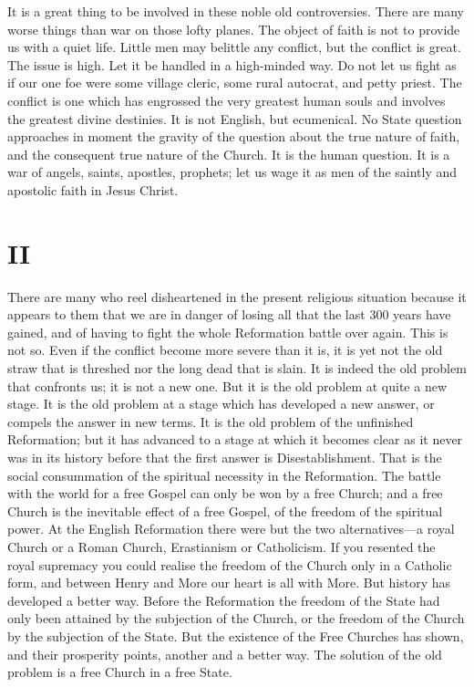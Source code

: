 \documentclass[12pt,a5paper,twoside]{book}
\begin{document}
It is a great thing to be involved in these noble 
old controversies. There are many worse things 
than war on those lofty planes. The object of faith 
is not to provide us with a quiet life. Little men 
may belittle any conflict, but the conflict is great. 
The issue is high. Let it be handled in a high-minded 
way. Do not let us fight as if our one foe 
were some village cleric, some rural autocrat, and 
petty priest. The conflict is one which has engrossed 
the very greatest human souls and involves the 
greatest divine destinies. It is not English, but 
ecumenical. No State question approaches in 
moment the gravity of the question about the true 
nature of faith, and the consequent true nature of the 
Church. It is the human question. It is a war of 
angels, saints, apostles, prophets; let us wage it as 
men of the saintly and apostolic faith in Jesus Christ. 

\section*{II}

There are many who reel disheartened in the present 
religious situation because it appears to them that we 
are in danger of losing all that the last 300 years 
have gained, and of having to fight the whole 
Reformation battle over again. This is not so. 
Even if the conflict become more severe than it is, 
it is yet not the old straw that is threshed nor the 
long dead that is slain. It is indeed the old problem 
that confronts us; it is not a new one. But it is 
the old problem at quite a new stage. It is the old 
problem at a stage which has developed a new answer, 
or compels the answer in new terms. It is the old 
problem of the unfinished Reformation; but it has 
advanced to a stage at which it becomes clear as it 
never was in its history before that the first answer is 
Disestablishment. That is the social consummation of 
the spiritual necessity in the Reformation. The battle 
with the world for a free Gospel can only be won by 
a free Church; and a free Church is the inevitable 
effect of a free Gospel, of the freedom of the spiritual 
power. At the English Reformation there were but 
the two alternatives---a royal Church or a Roman 
Church, Erastianism or Catholicism. If you resented 
the royal supremacy you could realise the freedom of 
the Church only in a Catholic form, and between 
Henry and More our heart is all with More. But 
history has developed a better way. Before the 
Reformation the freedom of the State had only been 
attained by the subjection of the Church, or the 
freedom of the Church by the subjection of the State. 
But the existence of the Free Churches has shown, 
and their prosperity points, another and a better way. 
The solution of the old problem is a free Church in 
a free State. 
\end{document}
